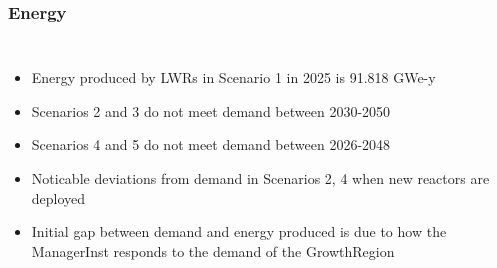 \begin{frame}
    \frametitle{Energy}
    \begin{columns}
        \column[t]{5cm}
        \begin{itemize}
            \item Energy produced by \glspl{LWR} in Scenario 1 in 2025 is 91.818 GWe-y
            \item Scenarios 2 and 3 do not meet demand between 2030-2050
            \item Scenarios 4 and 5 do not meet demand between 2026-2048
            \item Noticable deviations from demand in Scenarios 2, 4 when new 
                  reactors are deployed
            \item Initial gap between demand and energy produced is due to 
                  how the ManagerInst responds to the demand of the GrowthRegion
        \end{itemize}


\end{columns}
\end{frame}
